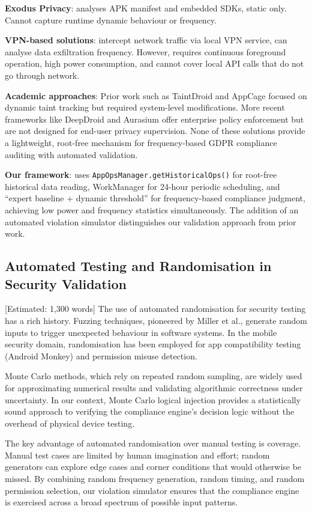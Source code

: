 \textbf{Exodus Privacy}: analyses APK manifest and embedded SDKs, static only. Cannot capture runtime dynamic behaviour or frequency.

\textbf{VPN-based solutions}: intercept network traffic via local VPN service, can analyse data exfiltration frequency. However, requires continuous foreground operation, high power consumption, and cannot cover local API calls that do not go through network.

\textbf{Academic approaches}: Prior work such as TaintDroid and AppCage focused on dynamic taint tracking but required system-level modifications. More recent frameworks like DeepDroid and Aurasium offer enterprise policy enforcement but are not designed for end-user privacy supervision. None of these solutions provide a lightweight, root-free mechanism for frequency-based GDPR compliance auditing with automated validation.

\textbf{Our framework}: uses \texttt{AppOpsManager.getHistoricalOps()} for root-free historical data reading, WorkManager for 24-hour periodic scheduling, and ``expert baseline + dynamic threshold'' for frequency-based compliance judgment, achieving low power and frequency statistics simultaneously. The addition of an automated violation simulator distinguishes our validation approach from prior work.

\subsection{Automated Testing and Randomisation in Security Validation} [Estimated: 1,300 words]
The use of automated randomisation for security testing has a rich history. Fuzzing techniques, pioneered by Miller et al., generate random inputs to trigger unexpected behaviour in software systems. In the mobile security domain, randomisation has been employed for app compatibility testing (Android Monkey) and permission misuse detection.

Monte Carlo methods, which rely on repeated random sampling, are widely used for approximating numerical results and validating algorithmic correctness under uncertainty. In our context, Monte Carlo logical injection provides a statistically sound approach to verifying the compliance engine's decision logic without the overhead of physical device testing.

The key advantage of automated randomisation over manual testing is coverage. Manual test cases are limited by human imagination and effort; random generators can explore edge cases and corner conditions that would otherwise be missed. By combining random frequency generation, random timing, and random permission selection, our violation simulator ensures that the compliance engine is exercised across a broad spectrum of possible input patterns.

